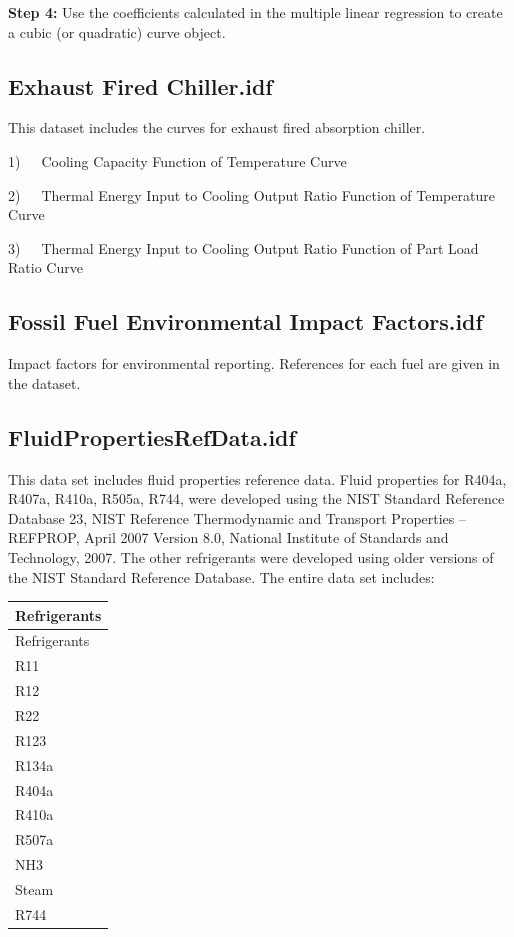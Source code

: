 \textbf{Step 4:} Use the coefficients calculated in the multiple linear regression to create a cubic (or quadratic) curve object.

\subsection{Exhaust Fired Chiller.idf}\label{exhaust-fired-chiller.idf}

This dataset includes the curves for exhaust fired absorption chiller.

1)~~~Cooling Capacity Function of Temperature Curve

2)~~~Thermal Energy Input to Cooling Output Ratio Function of Temperature Curve

3)~~~Thermal Energy Input to Cooling Output Ratio Function of Part Load Ratio Curve

\subsection{Fossil Fuel Environmental Impact Factors.idf}\label{fossil-fuel-environmental-impact-factors.idf}

Impact factors for environmental reporting. References for each fuel are given in the dataset.

\subsection{FluidPropertiesRefData.idf}\label{fluidpropertiesrefdata.idf}

This data set includes fluid properties reference data. Fluid properties for R404a, R407a, R410a, R505a, R744, were developed using the NIST Standard Reference Database 23, NIST Reference Thermodynamic and Transport Properties -- REFPROP, April 2007 Version 8.0, National Institute of Standards and Technology, 2007. The other refrigerants were developed using older versions of the NIST Standard Reference Database. The entire data set includes:

\begin{longtable}[c]{@{}l@{}}
\toprule
Refrigerants \tabularnewline
\midrule
\endfirsthead

\toprule
Refrigerants \tabularnewline
\midrule
\endhead

R11 \tabularnewline
R12 \tabularnewline
R22 \tabularnewline
R123 \tabularnewline
R134a \tabularnewline
R404a \tabularnewline
R410a \tabularnewline
R507a \tabularnewline
NH3 \tabularnewline
Steam \tabularnewline
R744 \tabularnewline
\bottomrule
\end{longtable}

